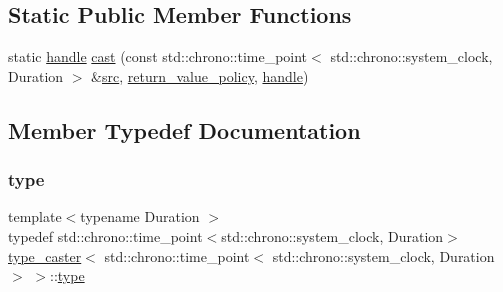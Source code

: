 \subsection*{Static Public Member Functions}
\begin{DoxyCompactItemize}
\item 
static \mbox{\hyperlink{classhandle}{handle}} \mbox{\hyperlink{classtype__caster_3_01std_1_1chrono_1_1time__point_3_01std_1_1chrono_1_1system__clock_00_01_duration_01_4_01_4_af07115c3eac3ae89af558f4670d63c7f}{cast}} (const std\+::chrono\+::time\+\_\+point$<$ std\+::chrono\+::system\+\_\+clock, Duration $>$ \&\mbox{\hyperlink{_s_d_l__opengl__glext_8h_a72e0fdf0f845ded60b1fada9e9195cd7}{src}}, \mbox{\hyperlink{detail_2common_8h_adde72ab1fb0dd4b48a5232c349a53841}{return\+\_\+value\+\_\+policy}}, \mbox{\hyperlink{classhandle}{handle}})
\end{DoxyCompactItemize}


\subsection{Member Typedef Documentation}
\mbox{\label{classtype__caster_3_01std_1_1chrono_1_1time__point_3_01std_1_1chrono_1_1system__clock_00_01_duration_01_4_01_4_aa6ea8713f4efcca306c1ceb74a2877c7}} 
\subsubsection{\texorpdfstring{type}{type}}
{\footnotesize\ttfamily template$<$typename Duration $>$ \\
typedef std\+::chrono\+::time\+\_\+point$<$std\+::chrono\+::system\+\_\+clock, Duration$>$ \mbox{\hyperlink{classtype__caster}{type\+\_\+caster}}$<$ std\+::chrono\+::time\+\_\+point$<$ std\+::chrono\+::system\+\_\+clock, Duration $>$ $>$\+::\mbox{\hyperlink{classtype__caster_3_01std_1_1chrono_1_1time__point_3_01std_1_1chrono_1_1system__clock_00_01_duration_01_4_01_4_aa6ea8713f4efcca306c1ceb74a2877c7}{type}}}



